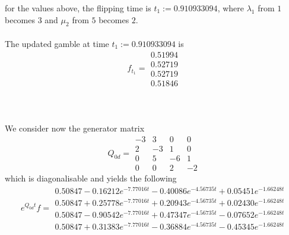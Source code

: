 \documentclass{article}
\begin{document}
for the values above, the flipping time is $t_{1}:= 0.910933094$, where $\lambda_{1}$ from $1$ becomes $3$ and $\mu_{2}$ from $5$ becomes $2$.\\\\
The updated gamble at time $t_{1}:= 0.910933094$ is
\begin{equation} \label{eq:ind_s1_4_f1_u}
 f_{t_1}= 
 \begin{array}{|c|}
  0.51994\\
  0.52719\\
  0.52719\\
  0.51846  
 \end{array}
 \end{equation}\\\\\\
We consider now the generator matrix 
\begin{equation*} 
 Q_{0d}= 
 \begin{array}{|rrrr|}
  -3 & 3 & 0 & 0 \\
  2 & -3 & 1 & 0 \\
  0 & 5 & -6 & 1 \\
  0 & 0 & 2 & -2 
 \end{array}
 \end{equation*}
which is diagonalisable and yields the following
\begin{equation*} 
 e^{Q_{0d}t}f= 
 \begin{array}{|r|}
  0.50847-0.16212e^{-7.77016t}- 0.40086e^{-4.56735t}+ 0.05451e^{-1.66248t}\\
  0.50847+0.25778e^{-7.77016t}+ 0.20943e^{-4.56735t}+ 0.02430e^{-1.66248t}\\
  0.50847-0.90542e^{-7.77016t}+ 0.47347e^{-4.56735t} - 0.07652e^{-1.66248t}\\
  0.50847+0.31383e^{-7.77016t}- 0.36884e^{-4.56735t}- 0.45345e^{-1.66248t}  
 \end{array}
 \end{equation*}
\end{document}
